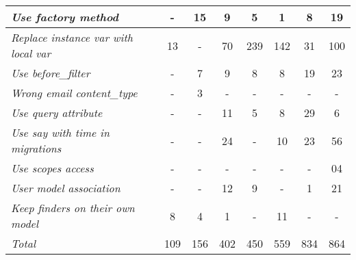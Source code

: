\documentclass[sle]{llncs}
\begin{document}
\begin{table}[H]
\begin{center}
{\begin{threeparttable}
\begin{tabular}{|l||c|c|c|c|c|c|c|}
\emph{Use factory method                    }              &   -  &  15  &   9  &   5 &   1 &   8 &  19  \\ \hline 
\emph{Replace instance var with local var   }              &  13  &   -  &  70  & 239 & 142 &  31 & 100  \\ \hline 
\emph{Use before\_filter                    }              &   -  &   7  &   9  &   8 &   8 &  19 &  23  \\ \hline 
\emph{Wrong email content\_type             }              &   -  &   3  &   -  &   - &   - &   - &   -  \\ \hline 
\emph{Use query attribute                   }              &   -  &   -  &  11  &   5 &   8 &  29 &   6  \\ \hline 
\emph{Use say with time in migrations       }              &   -  &   -  &  24  &   - &  10 &  23 &  56  \\ \hline 
\emph{Use scopes access                     }              &   -  &   -  &   -  &   - &   - &   - &  04  \\ \hline  
\emph{User model association                }              &   -  &   -  &  12  &   9 &   - &   1 &  21  \\ \hline  
\emph{Keep finders on their own model       }              &   8  &   4  &   1  &   - &  11 &   - &   -  \\ \hline  
\emph{Total                                 }              & 109  & 156  & 402  & 450 & 559 & 834 & 864  \\ \hline 
\end{tabular}


\end{threeparttable}}
\end{center}
\end{table}
\end{document}

